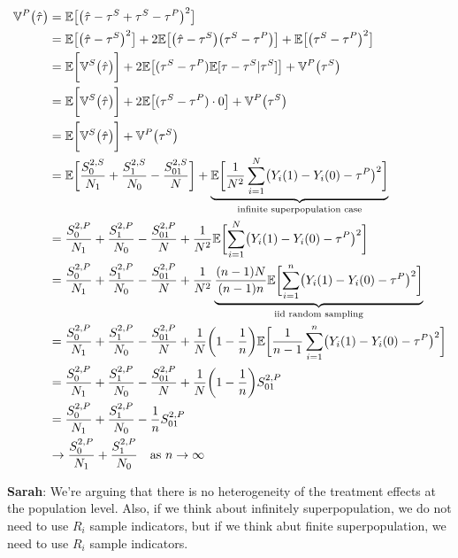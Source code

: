 \begin{align}
    {\mathbb{V}}^P\bigl(\hat\tau\bigr) &= {\mathbb{E}}\bigl[\bigl(\hat{\tau} - \tau^S + \tau^S - \tau^P\bigr)^2\bigr]\\
    &= {\mathbb{E}}\bigl[\bigl(\hat\tau - \tau^S\bigr)^2\bigr] + 2{\mathbb{E}}\bigl[\bigl(\hat\tau - \tau^S\bigr)\bigl(\tau^S - \tau^P\bigr)\bigr] + {\mathbb{E}}\bigl[\bigl(\tau^S - \tau^P\bigr)^2\bigr]\\
    &= {\mathbb{E}}\biggl[{\mathbb{V}}^S\bigl(\hat\tau\bigr)\biggr] + 2{\mathbb{E}}\bigl[(\tau^S- \tau^P){\mathbb{E}}[\tau - \tau^S|\tau^S]\bigr] + {\mathbb{V}}^P\bigl(\tau^S\bigr)\\
    &= {\mathbb{E}}\biggl[{\mathbb{V}}^S\bigl(\hat\tau\bigr)\biggr] + 2{\mathbb{E}}\bigl[(\tau^S- \tau^P)\cdot 0\bigr] +  {\mathbb{V}}^P\bigl(\tau^S\bigr)\\
    &= {\mathbb{E}}\biggl[{\mathbb{V}}^S\bigl(\hat\tau\bigr)\biggr] +  {\mathbb{V}}^P\bigl(\tau^S\bigr)\\
    &= {\mathbb{E}}\biggl[\frac{S_0^{2,S}}{N_1} + \frac{S_1^{2,S}}{N_0} - \frac{S_{01}^{2,S}}{N}\biggr] + \underbrace{{\mathbb{E}} \biggl[\frac{1}{N^2} \sum_{i=1}^N \bigl(Y_i(1) - Y_i(0)-\tau^P\bigr)^2\biggr]}_\text{infinite superpopulation case}\\
    &= \frac{S_0^{2,P}}{N_1} + \frac{S_1^{2,P}}{N_0} - \frac{S_{01}^{2,P}}{N} + \frac{1}{N^2}{\mathbb{E}}\biggl[\sum_{i=1}^N \bigl(Y_i(1) - Y_i(0)-\tau^P\bigr)^2\biggr]     \\
    &= \frac{S_0^{2,P}}{N_1} + \frac{S_1^{2,P}}{N_0} - \frac{S_{01}^{2,P}}{N} + \frac{1}{N^2} \underbrace{\frac{(n-1)N}{(n-1)n}{\mathbb{E}}\biggl[\sum_{i=1}^n \bigl(Y_i(1) - Y_i(0)-\tau^P\bigr)^2\biggr]}_\text{iid random sampling}\\
    &= \frac{S_0^{2,P}}{N_1} + \frac{S_1^{2,P}}{N_0} - \frac{S_{01}^{2,P}}{N} + \frac{1}{N} \biggl(1-\frac{1}{n}\biggr){\mathbb{E}}\biggl[\frac{1}{n-1}\sum_{i=1}^n \bigl(Y_i(1) - Y_i(0)-\tau^P\bigr)^2\biggr]\\
    &= \frac{S_0^{2,P}}{N_1} + \frac{S_1^{2,P}}{N_0} - \frac{S_{01}^{2,P}}{N} + \frac{1}{N} \biggl(1-\frac{1}{n}\biggr)S_{01}^{2,P}\\
    &= \frac{S_0^{2,P}}{N_1} + \frac{S_1^{2,P}}{N_0} -\frac{1}{n}S_{01}^{2,P}\\
    &\to \frac{S_0^{2,P}}{N_1} + \frac{S_1^{2,P}}{N_0} \quad \text{as } n \to \infty
\end{align}

\textbf{Sarah}: We're arguing that there is no heterogeneity of the treatment effects at the population level. Also, if we think about infinitely superpopulation, we do not need to use $R_i$ sample indicators, but if we think abut finite superpopulation, we need to use $R_i$ sample indicators.


